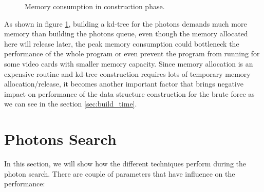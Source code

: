 \begin{figure}[ftp] 
    \centering 
    \renewcommand{\thefigure}{\thechapter.\arabic{figure}}
    \caption[Memory consumption in construction phase]{Memory consumption in construction phase. }
    \label{fig:memory_consumption_2}  
\end{figure}   

As shown in figure \ref{fig:memory_consumption_2}, building a kd-tree for the photons demands much more memory than building the photons queue, even though the memory allocated here will release later, the peak memory consumption could bottleneck the performance of the whole program or even prevent the program from running for some video cards with smaller memory capacity. Since memory allocation is an expensive routine and kd-tree construction requires lots of temporary memory allocation/release, it becomes another important factor that brings negative impact on performance of the data structure construction for the brute force as we can see in the section \ref{sec:build_time}.  

\section{Photons Search}

In this section, we will show how the different techniques perform during the photon search. There are couple of parameters that have influence on the performance: 

